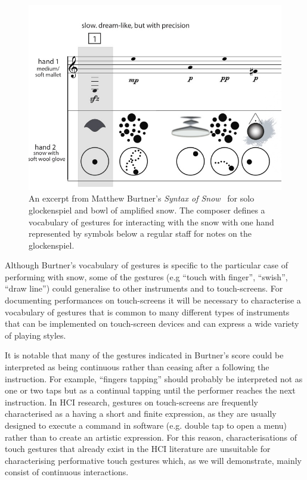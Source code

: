 \documentclass[graybox]{svmult}
\begin{document}
\begin{figure}[h] \centering
\includegraphics[width=0.7\columnwidth]{figures/syntaxofsnow-excerpt.jpg}
\caption{An excerpt from Matthew Burtner's \emph{Syntax of
    Snow}~\cite{Burtner:2011fk} for solo glockenspiel and bowl of
  amplified snow. The composer defines a vocabulary of
  gestures for interacting with the snow with one hand represented by
  symbols below a regular staff for notes on the glockenspiel.}
\label{fig:SyntaxOfSnow}
\end{figure}

Although Burtner's vocabulary of gestures is specific to the
particular case of performing with snow, some of the gestures (e.g
``touch with finger'', ``swish'', ``draw line'') could generalise to
other instruments and to touch-screens. For documenting performances
on touch-screens it will be necessary to characterise a vocabulary of
gestures that is common to many different types of instruments that
can be implemented on touch-screen devices and can express a wide
variety of playing styles.

It is notable that many of the gestures indicated in Burtner's score
could be interpreted as being continuous rather than ceasing after a
following the instruction. For example, ``fingers tapping'' should
probably be interpreted not as one or two taps but as a continual
tapping until the performer reaches the next instruction. In HCI
research, gestures on touch-screens are frequently characterised as a
having a short and finite expression, as they are usually designed to
execute a command in software (e.g. double tap to open a menu) rather
than to create an artistic expression. For this reason,
characterisations of touch gestures that already exist in the HCI
literature are unsuitable for characterising performative touch
gestures which, as we will demonstrate, mainly consist of continuous
interactions. 
\end{document}
